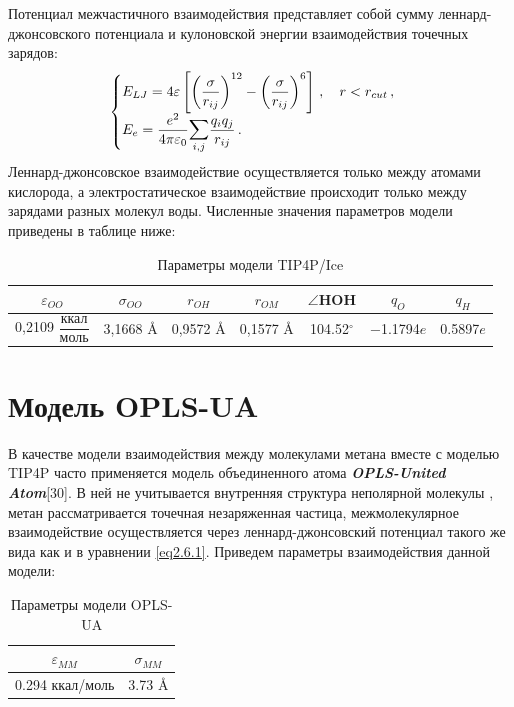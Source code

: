 Потенциал межчастичного взаимодействия представляет собой сумму леннард-джонсовского потенциала и кулоновской энергии взаимодействия точечных зарядов:
\begin{equation}
    \begin{cases}
        E_{LJ} = 4\varepsilon\left[\left(\dfrac{\sigma}{r_{ij}}\right)^{12} - \left(\dfrac{\sigma}{r_{ij}}\right)^6\right]\,,\quad r<r_{cut}\,, \\
        E_{e} = \dfrac{e^2}{4\pi\varepsilon_0}\mathlarger{\mathlarger{\sum}}\limits_{i,j}\dfrac{q_i q_j}{r_{ij}}\,.
    \end{cases}
    \label{eq2.6.1}
\end{equation}
Леннард-джонсовское взаимодействие осуществляется только между атомами кислорода, а электростатическое взаимодействие происходит только между зарядами разных молекул воды. Численные значения параметров модели приведены в таблице ниже:
\begin{table}[H]
    \centering
    \caption{Параметры модели TIP4P/Ice}
    \renewcommand{\arraystretch}{1.8}
    \begin{tabular}{c|c|c|c|c|c|c}
        $\varepsilon_{OO}$ & $\sigma_{OO}$ & $r_{OH}$ & $r_{OM}$ & $\angle$HOH & $q_{O}$ & $q_{H}$ \\ \hline
        0,2109 $\dfrac{\text{ккал}}{\text{моль}}$ & 3,1668 $\si{\angstrom}$ & 0,9572 $\si{\angstrom}$ & 0,1577 $\si{\angstrom}$ & 104.52$^{\circ}$ & −1.1794$e$ & 0.5897$e$ \\ 
    \end{tabular}
    \label{table1}
\end{table}

\section{Модель OPLS-UA}
В качестве модели взаимодействия между молекулами метана вместе с моделью TIP4P часто применяется модель объединенного атома \textbf{\textit{OPLS-United Atom}}[30]. В ней не учитывается внутренняя структура неполярной молекулы , метан рассматривается точечная незаряженная частица, межмолекулярное взаимодействие осуществляется через леннард-джонсовский потенциал такого же вида как и в уравнении \eqref{eq2.6.1}. Приведем параметры взаимодействия данной модели:

\begin{table}[H]
    \centering
    \caption{Параметры модели OPLS-UA}
    \renewcommand{\arraystretch}{1.5}
    \begin{tabular}{c|c}
        $\varepsilon_{MM}$ & $\sigma_{MM}$ \\ \hline
        0.294 ккал/моль & 3.73 $\si{\angstrom}$
    \end{tabular}
    \label{table2}
\end{table}

